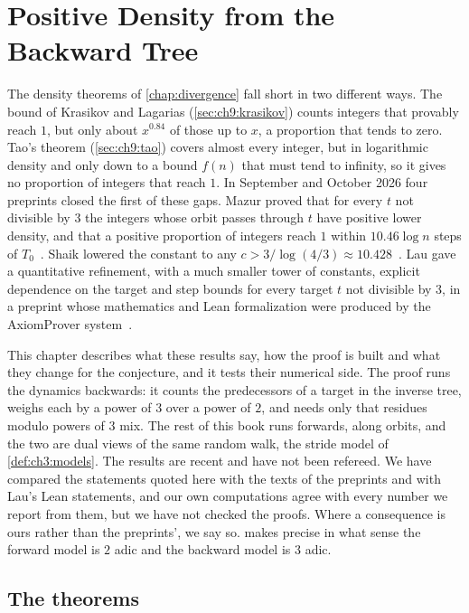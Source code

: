 \chapter{Positive Density from the Backward Tree}\label{chap:backward}

The density theorems of \cref{chap:divergence} fall short in two different ways. The bound of Krasikov and Lagarias (\cref{sec:ch9:krasikov}) counts integers that provably reach $1$, but only about $x^{0.84}$ of those up to $x$, a proportion that tends to zero. Tao's theorem (\cref{sec:ch9:tao}) covers almost every integer, but in logarithmic density and only down to a bound $f(n)$ that must tend to infinity, so it gives no proportion of integers that reach $1$. In September and October 2026 four preprints closed the first of these gaps. Mazur proved that for every $t$ not divisible by $3$ the integers whose orbit passes through $t$ have positive lower density, and that a positive proportion of integers reach $1$ within $10.46\log n$ steps of $T_0$~\cite{mazur2026pred,mazur2026time}. Shaik lowered the constant to any $c>3/\log(4/3)\approx10.428$~\cite{shaik2026}. Lau gave a quantitative refinement, with a much smaller tower of constants, explicit dependence on the target and step bounds for every target $t$ not divisible by $3$, in a preprint whose mathematics and Lean formalization were produced by the AxiomProver system~\cite{lau2026}.

This chapter describes what these results say, how the proof is built and what they change for the conjecture, and it tests their numerical side. The proof runs the dynamics backwards: it counts the predecessors of a target in the inverse tree, weighs each by a power of $3$ over a power of $2$, and needs only that residues modulo powers of $3$ mix. The rest of this book runs forwards, along orbits, and the two are dual views of the same random walk, the stride model of \cref{def:ch3:models}. The results are recent and have not been refereed. We have compared the statements quoted here with the texts of the preprints and with Lau's Lean statements, and our own computations agree with every number we report from them, but we have not checked the proofs. Where a consequence is ours rather than the preprints', we say so.  makes precise in what sense the forward model is $2$ adic and the backward model is $3$ adic.

\section{The theorems}\label{sec:ch9b:theorems}

